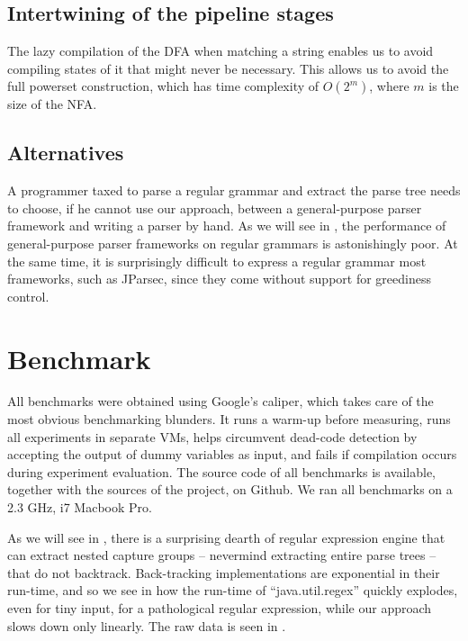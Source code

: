 \documentclass[english]{sigplanconf}
\theoremstyle{definition}
\begin{document}
\subsection{Intertwining of the pipeline stages}
The lazy compilation of the DFA when matching a string enables us
to avoid compiling states of it that might never be necessary. This
allows us to avoid the full powerset construction\cite{Sips05a}, which has 
time complexity of $O(2^m)$, where $m$ is the size of the NFA.

\subsection{Alternatives}
A programmer taxed to parse a regular grammar and extract the parse tree needs to choose, 
if he cannot use our approach, between a general-purpose parser framework and writing a
parser by hand. As we will see in , the performance of general-purpose 
parser frameworks on regular grammars is astonishingly poor. At the same time, it is 
surprisingly difficult to express a regular grammar most frameworks, such as JParsec,
since they come without support for greediness control.

\section{Benchmark}
All benchmarks were obtained using Google's caliper, which takes
care of the most obvious benchmarking blunders.  It runs a warm-up
before measuring, runs all experiments in separate VMs, helps
circumvent dead-code detection by accepting the output of dummy
variables as input, and fails if compilation occurs during experiment
evaluation.  The source code of all benchmarks is available, together
with the sources of the project, on Github. We ran all benchmarks
on a 2.3 GHz, i7 Macbook Pro.


As we will see in , there is a surprising dearth
of regular expression engine that can extract nested capture groups
-- nevermind extracting entire parse trees -- that do not backtrack.
Back-tracking implementations are exponential in their run-time,
and so we see in  how the run-time of ``java.util.regex''
quickly explodes, even for tiny input, for a pathological regular
expression, while our approach slows down only linearly. The raw
data is seen in .
\end{document}
